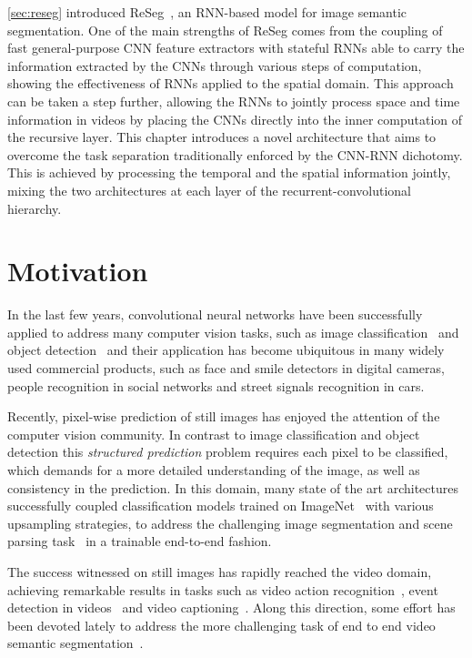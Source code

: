 \autoref{sec:reseg} introduced ReSeg~\citep{Visin_2016_CVPR_Workshops}, an
RNN-based model for image semantic segmentation. One of the main strengths of
ReSeg comes from the coupling of fast general-purpose CNN feature extractors
with stateful RNNs able to carry the information extracted by the CNNs through
various steps of computation, showing the effectiveness of RNNs applied to the
spatial domain. This approach can be taken a step further, allowing the RNNs
to jointly process space and time information in videos by placing the CNNs
directly into the inner computation of the recursive layer. This chapter
introduces a novel architecture that aims to overcome the task separation
traditionally enforced by the CNN-RNN dichotomy. This is achieved by processing
the temporal and the spatial information jointly, mixing the two architectures
at each layer of the recurrent-convolutional hierarchy.


\section{Motivation}

In the last few years, convolutional neural networks have been
successfully applied to address many computer vision tasks, such as image
classification~\citep{Krizhevsky2012-alexnet,Simonyan2015,
Szegedy-et-al-arxiv2014} and object detection~\citep{Girshick-et-al-arxiv2013,
Sermanet13overfeat} and their application has become ubiquitous in many widely
used commercial products, such as face and smile detectors in digital cameras,
people recognition in social networks and street signals recognition in cars.

Recently, pixel-wise prediction of still images has enjoyed the attention
of the computer vision community. In contrast to image classification and
object detection this \emph{structured prediction} problem requires each
pixel to be classified, which demands for a more detailed understanding of
the image, as well as consistency in the prediction. In this domain, many
state of the art architectures successfully coupled classification models
trained on ImageNet~\citep{Simonyan14vgg,Szegedy15googlelenet} with various
upsampling strategies, to address the challenging image segmentation and scene
parsing task~\citep[see e.g.,~][]{long2014fully,noh2015learning} in a trainable
end-to-end fashion.

The success witnessed on still images has rapidly reached the video domain,
achieving remarkable results in tasks such as video action recognition~\citep{
simonyan2014two,karpathy2014large}, event detection in videos~\citep{
yeung2015end} and video captioning~\citep{yao2015describing}. Along this
direction, some effort has been devoted lately to address the more
challenging task of end to end video semantic segmentation~\citep{Tran16v2v}.

